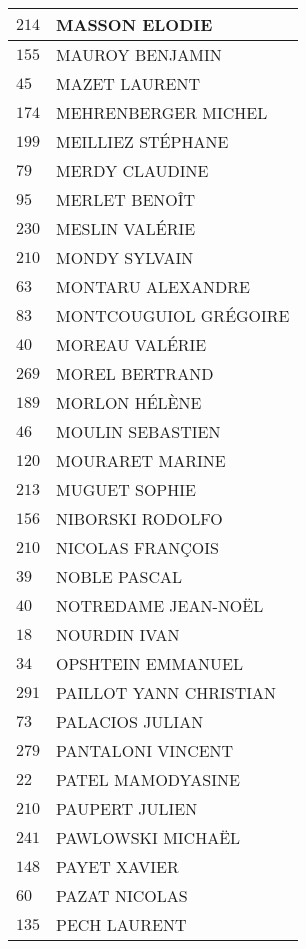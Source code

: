 \begin{xltabular}{\linewidth}{|l|X|}
    \hline
    $214$ & MASSON ELODIE \\
    \hline
    $155$ & MAUROY BENJAMIN \\
    \hline
    $45$ & MAZET LAURENT \\
    \hline
    $174$ & MEHRENBERGER MICHEL \\
    \hline
    $199$ & MEILLIEZ STÉPHANE \\
    \hline
    $79$ & MERDY CLAUDINE \\
    \hline
    $95$ & MERLET BENOÎT \\
    \hline
    $230$ & MESLIN VALÉRIE \\
    \hline
    $210$ & MONDY SYLVAIN \\
    \hline
    $63$ & MONTARU ALEXANDRE \\
    \hline
    $83$ & MONTCOUGUIOL GRÉGOIRE \\
    \hline
    $40$ & MOREAU VALÉRIE \\
    \hline
    $269$ & MOREL BERTRAND \\
    \hline
    $189$ & MORLON HÉLÈNE \\
    \hline
    $46$ & MOULIN SEBASTIEN \\
    \hline
    $120$ & MOURARET MARINE \\
    \hline
    $213$ & MUGUET SOPHIE \\
    \hline
    $156$ & NIBORSKI RODOLFO \\
    \hline
    $210$ & NICOLAS FRANÇOIS \\
    \hline
    $39$ & NOBLE PASCAL \\
    \hline
    $40$ & NOTREDAME JEAN-NOËL \\
    \hline
    $18$ & NOURDIN IVAN \\
    \hline
    $34$ & OPSHTEIN EMMANUEL \\
    \hline
    $291$ & PAILLOT YANN CHRISTIAN \\
    \hline
    $73$ & PALACIOS JULIAN \\
    \hline
    $279$ & PANTALONI VINCENT \\
    \hline
    $22$ & PATEL MAMODYASINE \\
    \hline
    $210$ & PAUPERT JULIEN \\
    \hline
    $241$ & PAWLOWSKI MICHAËL \\
    \hline
    $148$ & PAYET XAVIER \\
    \hline
    $60$ & PAZAT NICOLAS \\
    \hline
    $135$ & PECH LAURENT \\

\end{xltabular}
